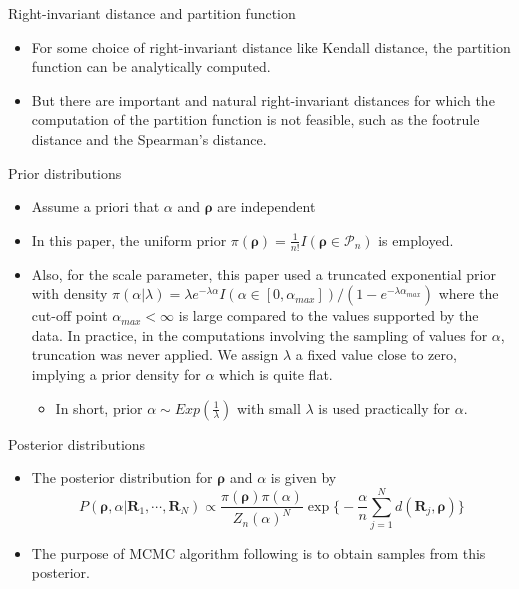 \documentclass[11pt]{beamer}
\begin{document}
\begin{frame}{Right-invariant distance and partition function}
\begin{itemize}
    \item For some choice of right-invariant distance like Kendall distance, the partition function can be analytically computed. 
    \item But there are important and natural right-invariant distances for which the computation of the partition function is not feasible, such as the footrule distance and the Spearman's distance.
\end{itemize}
\end{frame}

\begin{frame}{Prior distributions}
    \begin{itemize}
        \item Assume a priori that $\alpha$ and $\boldsymbol{\rho}$ are independent
        \item In this paper, the uniform prior $\pi(\boldsymbol{\rho})=\frac{1}{n!}I(\boldsymbol{\rho}\in \mathcal{P}_n)$ is employed.
        \item Also, for the scale parameter, this paper used a truncated exponential prior with density $\pi(\alpha | \lambda)=\lambda e^{-\lambda \alpha}I(\alpha\in [0, \alpha_{max}])/(1-e^{-\lambda \alpha_{max}})$ where the cut-off point $\alpha_{max}<\infty$ is large compared to the values supported by the data. In practice, in the computations involving the sampling of values for $\alpha$, truncation was never applied. We assign $\lambda$ a fixed value close to zero, implying a prior density for $\alpha$ which is quite flat.
        \begin{itemize}
            \item In short, prior $\alpha \sim Exp(\frac{1}{\lambda})$ with small $\lambda$ is used practically for $\alpha$. 
        \end{itemize}
    \end{itemize}
\end{frame}

\begin{frame}{Posterior distributions}
\begin{itemize}
    \item The posterior distribution for $\boldsymbol{\rho}$ and $\alpha$ is given by
    \begin{equation} \label{posterior}
        P(\boldsymbol{\rho}, \alpha| \mathbf{R}_1, \cdots, \mathbf{R}_N)\propto \frac{\pi(\boldsymbol{\rho})\pi(\alpha)}{Z_n(\alpha)^N} \exp \big\{-\frac{\alpha}{n}\sum_{j=1}^N d(\mathbf{R}_j, \boldsymbol{\rho})\big\}
    \end{equation}
    \item The purpose of MCMC algorithm following is to obtain samples from this posterior.
\end{itemize}
\end{frame}
\end{document}
